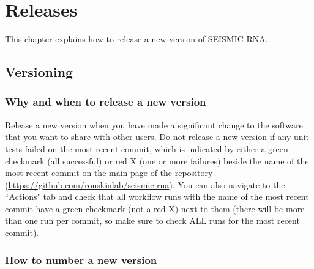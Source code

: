 \documentclass[main.tex]{subfiles}
\begin{document}
\chapter{Releases}

This chapter explains how to release a new version of SEISMIC-RNA.


\section{Versioning}

\subsection{Why and when to release a new version}

Release a new version when you have made a significant change to the software that you want to share with other users.
Do not release a new version if any unit tests failed on the most recent commit, which is indicated by either a green checkmark (all successful) or red X (one or more failures) beside the name of the most recent commit on the main page of the repository (\url{https://github.com/rouskinlab/seismic-rna}).
You can also navigate to the ``Actions" tab and check that all workflow runs with the name of the most recent commit have a green checkmark (not a red X) next to them (there will be more than one run per commit, so make sure to check ALL runs for the most recent commit).


\subsection{How to number a new version}
\end{document}
